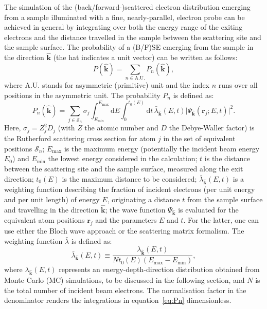 The simulation of the (back/forward-)scattered electron distribution emerging from a sample illuminated with a fine, nearly-parallel, electron probe can be achieved in general by integrating over both the energy range of the exiting electrons and the distance travelled in the sample between the scattering site and the sample surface. The probability of a (B/F)SE emerging from the sample in the direction $\hat{\mathbf{k}}$ (the hat indicates a unit vector) can be written as follows:
\begin{equation}
    P(\hat{\mathbf{k}}) = \sum_{n\in\text{A.U.}} P_n(\hat{\mathbf{k}}),
\end{equation}
where A.U. stands for asymmetric (primitive) unit and the index $n$ runs over all positions in the asymmetric unit.  The probability $P_n$ is defined as:
\begin{equation}
    P_n(\hat{\mathbf{k}}) = \sum_{j\in \mathcal{S}_n}\sigma_j\int_{E_{\text{min}}}^{E_{\text{max}}}\!\!\!\!\mathrm{d}E
    \int_0^{t_0(E)}\!\!\!\!\!\!\mathrm{d}t\, \bar{\lambda}_{\hat{\mathbf{k}}}(E,t)\vert\Psi_{\hat{\mathbf{k}}}(\mathbf{r}_j;E,t)\vert^2.\label{eq:Pn}
\end{equation}
Here, $\sigma_j=Z^2_j D_j$ (with $Z$ the atomic number and $D$ the Debye-Waller factor) is the Rutherford scattering cross section for atom $j$ in the set of equivalent positions $\mathcal{S}_n$; $E_{\text{max}}$ is the maximum energy (potentially the incident beam energy $E_0$) and $E_{\text{min}}$ the lowest energy considered in the calculation; $t$ is the distance between the scattering site and the sample surface, measured along the exit direction; $t_0(E)$ is the maximum distance to be considered; $\bar{\lambda}_{\hat{\mathbf{k}}}(E,t)$ is a weighting function describing the fraction of incident electrons (per unit energy and per unit length) of energy $E$, originating a distance $t$ from the sample surface and travelling in the direction $\hat{\mathbf{k}}$; the wave function $\Psi_{\hat{\mathbf{k}}}$ is evaluated for the equivalent atom positions $\mathbf{r}_j$ and the parameters $E$ and $t$. For the latter, one can use either the Bloch wave approach or the scattering matrix formalism.  The weighting function $\bar{\lambda}$ is defined as:
\begin{equation}
    \bar{\lambda}_{\hat{\mathbf{k}}}(E,t) \equiv \frac{\lambda_{\hat{\mathbf{k}}}(E,t)}{N t_0(E)(E_{\text{max}}-E_{\text{min}})},
\end{equation}
where $\lambda_{\hat{\mathbf{k}}}(E,t)$ represents an energy-depth-direction distribution obtained from Monte Carlo (MC) simulations, to be discussed in the following section, and $N$ is the total number of incident beam electrons.  The normalisation factor in the denominator renders the integrations in equation~\ref{eq:Pn} dimensionless.

